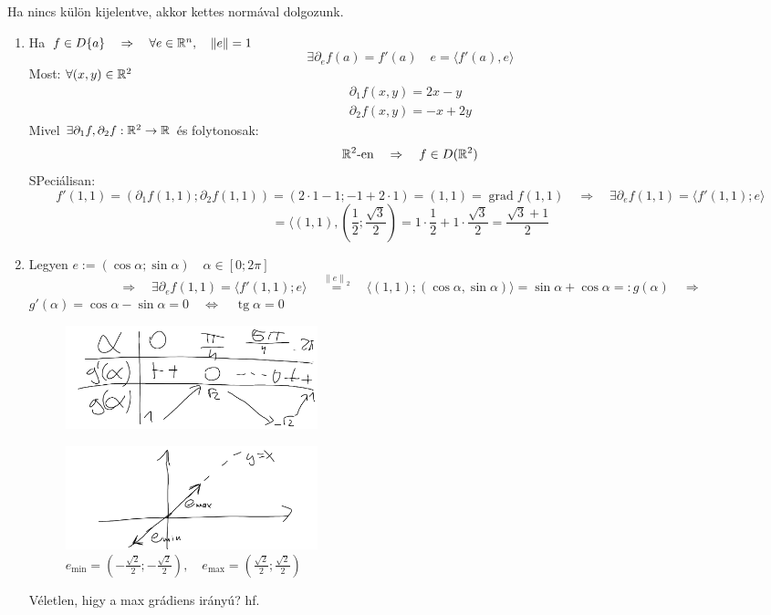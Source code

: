 \documentclass[a4paper,11.5pt]{article}
\DeclareMathOperator{\tg}{tg}
\DeclareMathOperator{\grad}{grad}
\newcommand{\norm}[1]{\left\lVert#1\right\rVert}
\begin{document}
	\begin{note}
		Ha nincs külön kijelentve, akkor kettes normával dolgozunk.
	\end{note}
	\begin{note}
		\begin{enumerate}
			\item Ha $f\in D\{a\}\quad \Rightarrow\quad \forall e\in\R^n,\quad \norm{e}=1$
			\[ \exists\partial_ef(a)=f'(a)\quad e=\langle f'(a),e\rangle \]
			Most: $\forall (x,y)\in\mathbb{R}^2$
			\begin{align*}
				\partial_1f(x,y)=2x-y\\
				\partial_2f(x,y)=-x+2y	
			\end{align*}
			Mivel $\exists\partial_1f, \partial_2f: \mathbb{R}^2\to\mathbb{R}$ és folytonosak:
			\[ \mathbb{R}^2\text{-en}\quad \Rightarrow\quad f\in D(\mathbb{R}^2) \]
			SPeciálisan:
			\[ f'(1,1)=(\partial_1f(1,1);\partial_2f(1,1))=(2\cdot1-1;-1+2\cdot1)=(1,1)=\grad f(1,1)\quad \Rightarrow\quad \exists\partial_ef(1,1)=\langle f'(1,1);e\rangle \]
			\[ =\langle(1,1),\left(\frac{1}{2};\frac{\sqrt{3}}{2}\right)=1\cdot\frac{1}{2}+1\cdot\frac{\sqrt{3}}{2}=\frac{\sqrt{3}+1}{2} \]
			\item Legyen $e:=(\cos\alpha; \sin\alpha)\quad \alpha\in[0;2\pi]$
			\[ \Rightarrow\quad \exists\partial_ef(1,1)=\langle f'(1,1);e\rangle\quad \overset{\norm{e}_2}{=}\quad \langle(1,1);(\cos\alpha,\sin\alpha)\rangle=\sin\alpha+\cos\alpha=:g(\alpha)\quad \Rightarrow \]
			$g'(\alpha)=\cos\alpha-\sin\alpha=0\quad \Leftrightarrow\quad \tg\alpha=0$
			\begin{figure}[H]
				\centering
				\includegraphics[height=3cm]{kepek/32.png}
				\caption{}
			\end{figure}
			\begin{figure}[H]
				\centering
				\includegraphics[height=3cm]{kepek/33.png}
				\caption{$e_{\min}= \left(-\frac{\sqrt{2}}{2};-\frac{\sqrt{2}}{2}\right),\quad e_{\max}= \left(\frac{\sqrt{2}}{2};\frac{\sqrt{2}}{2}\right)$}
			\end{figure}
			Véletlen, higy a max grádiens irányú? hf.
		\end{enumerate}
	\end{note}
\end{document}
